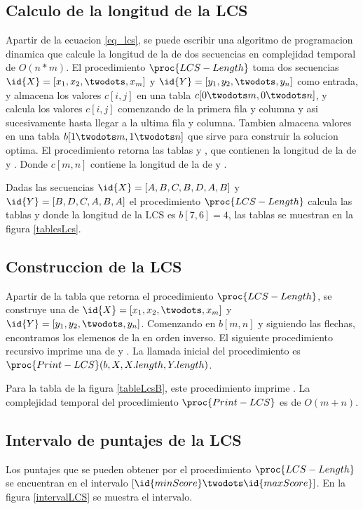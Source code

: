 \subsection{Calculo de la longitud de la LCS}
Apartir de la ecuacion \ref{eq_lcs}, se puede escribir una algoritmo de programacion dinamica que calcule la longitud de la  de dos secuencias en complejidad temporal de $O(n * m)$.
El procedimiento $\proc{LCS-Length}$ toma dos secuencias $\id{X} = [x_1,x_2,\twodots,x_m]$ y $\id{Y} = [y_1,y_2,\twodots,y_n]$ como entrada, y almacena los valores $c[i,j]$ en una tabla $c[0 \twodots m, 0 \twodots n]$, y calcula los valores $c[i,j]$ comenzando de la primera fila y columna y asi sucesivamente hasta llegar a la ultima fila y columna. Tambien almacena valores en una tabla $b[1 \twodots m, 1 \twodots n]$ que sirve para construir la solucion optima. El procedimiento retorna las tablas  y , que contienen la longitud de la  de  y . Donde $c[m,n]$ contiene la longitud de la  de  y .



Dadas las secuencias $\id{X} = [A,B,C,B,D,A,B]$ y $\id{Y} = [B,D,C,A,B,A]$ el procedimiento $\proc{LCS-Length}$ calcula las tablas  y  donde la longitud de la LCS es $b[7,6] = 4$, las tablas se muestran en la figura \ref{tablesLcs}.



\subsection{Construccion de la LCS}
Apartir de la tabla  que retorna el procedimiento $\proc{LCS-Length}$, se construye una  de $\id{X}=[x_1,x_2,\twodots,x_m]$ y $\id{Y}=[y_1,y_2,\twodots,y_n]$. Comenzando en $b[m,n]$ y siguiendo las flechas, encontramos los elemenos de la  en orden inverso. El siguiente procedimiento recursivo imprime una  de  y . La llamada inicial del procedimiento es $\proc{Print-LCS}(b, X, X.length, Y.length)$.



Para la tabla  de la figura \ref{tableLcsB}, este procedimiento imprime . La complejidad temporal del procedimiento $\proc{Print-LCS}$ es de $O(m + n)$.

\subsection{Intervalo de puntajes de la LCS}
Los puntajes que se pueden obtener por el procedimiento $\proc{LCS-Length}$ se encuentran en el intervalo $[\id{minScore} \twodots \id{maxScore}]$. En la figura \ref{intervalLCS} se muestra el intervalo.

